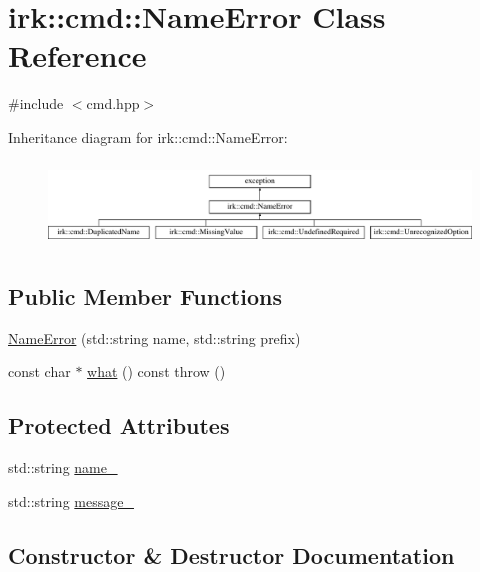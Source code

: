 \hypertarget{classirk_1_1cmd_1_1NameError}{}\section{irk\+:\+:cmd\+:\+:Name\+Error Class Reference}
\label{classirk_1_1cmd_1_1NameError}


{\ttfamily \#include $<$cmd.\+hpp$>$}

Inheritance diagram for irk\+:\+:cmd\+:\+:Name\+Error\+:\begin{figure}[H]
\begin{center}
\leavevmode
\includegraphics[height=2.282609cm]{classirk_1_1cmd_1_1NameError}
\end{center}
\end{figure}
\subsection*{Public Member Functions}
\begin{DoxyCompactItemize}
\item 
\mbox{\hyperlink{classirk_1_1cmd_1_1NameError_a754dfc0ff6ad00a648452b338a247931}{Name\+Error}} (std\+::string name, std\+::string prefix)
\item 
const char $\ast$ \mbox{\hyperlink{classirk_1_1cmd_1_1NameError_a4b40b1eb98ba9013a64aa3217482fe42}{what}} () const  throw ()
\end{DoxyCompactItemize}
\subsection*{Protected Attributes}
\begin{DoxyCompactItemize}
\item 
std\+::string \mbox{\hyperlink{classirk_1_1cmd_1_1NameError_a237c9a03da698698cec0107db449b962}{name\+\_\+}}
\item 
std\+::string \mbox{\hyperlink{classirk_1_1cmd_1_1NameError_ade50aeda2753957400b17a9a5127e744}{message\+\_\+}}
\end{DoxyCompactItemize}


\subsection{Constructor \& Destructor Documentation}
\mbox{\label{classirk_1_1cmd_1_1NameError_a754dfc0ff6ad00a648452b338a247931}} 
